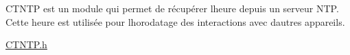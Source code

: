 CTNTP est un module qui permet de récupérer l\textquotesingle{}heure depuis un serveur NTP. Cette heure est utilisée pour l\textquotesingle{}horodatage des interactions avec d\textquotesingle{}autres appareils.

\mbox{\hyperlink{_c_t_n_t_p_8h}{CTNTP.\+h}} 